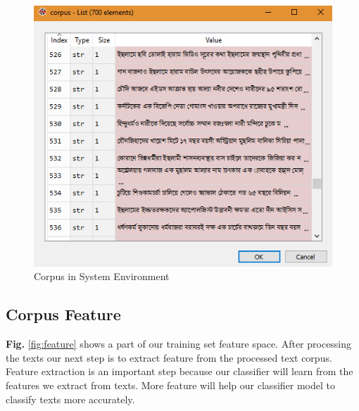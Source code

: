\documentclass[12pt,a4paper]{report}
\begin{document}
\begin{figure}[h!]
    \centering
    \includegraphics[scale=0.6]{Figures/corpus.PNG}
    \caption{Corpus in System Environment}
    \label{fig:crps}
\end{figure}

\subsection{Corpus Feature}
\textbf{Fig.} \ref{fig:feature} shows a part of our training set feature space.
After processing the texts our next step is to extract feature from the processed text corpus. Feature extraction is an important step because our classifier will learn from the features we extract from texts. More feature will help our classifier model to classify texts more accurately.
\end{document}
